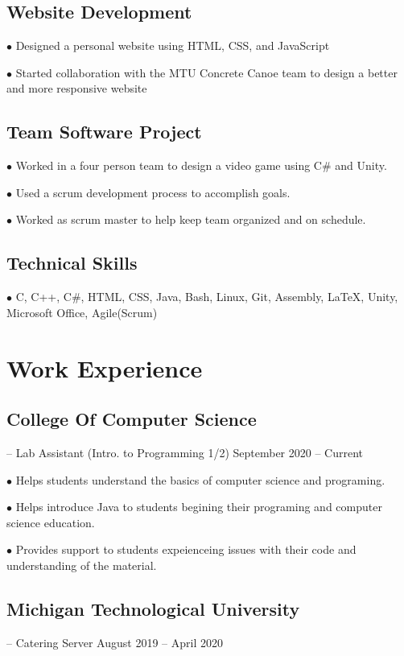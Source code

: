 \documentclass{article}
\begin{document}
\subsection{Website Development}\hfill

$\bullet$ Designed a personal website using HTML, CSS, and JavaScript

$\bullet$ Started collaboration with the MTU Concrete Canoe team to design a better and more responsive website


\subsection{Team Software Project} \hfill

$\bullet$ Worked in a four person team to design a video game using C\# and Unity.

$\bullet$ Used a scrum development process to accomplish goals.

$\bullet$ Worked as scrum master to help keep team organized and on schedule.

\subsection{Technical Skills} \hfill

$\bullet$  C, C++, C\#, HTML, CSS, Java, Bash, Linux, Git, Assembly, {\LaTeX}, Unity, Microsoft Office, Agile(Scrum)

\section{Work Experience}

\subsection{College Of Computer Science} -- Lab Assistant (Intro. to Programming 1/2) \hfill September 2020 -- Current

$\bullet$ Helps students understand the basics of computer science and programing.

$\bullet$ Helps introduce Java to students begining their programing and computer science education.

$\bullet$ Provides support to students expeienceing issues with their code and understanding of the material.


\subsection{Michigan Technological University}-- Catering Server \hfill August 2019 -- April 2020
\end{document}
